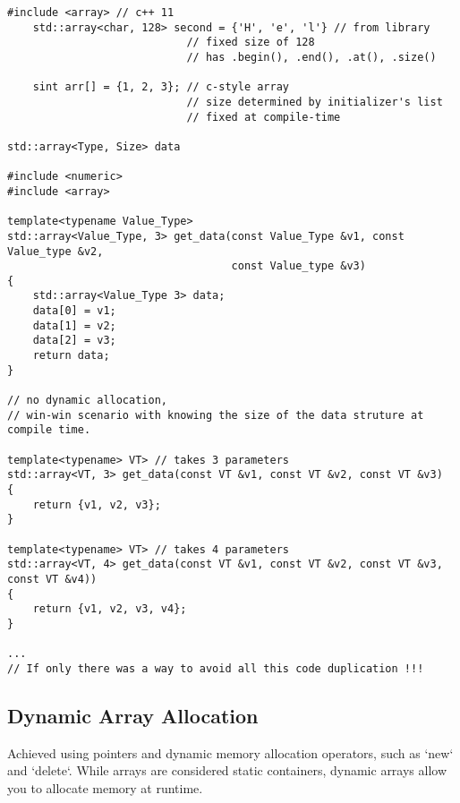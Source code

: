 \documentclass[openany]{report}
\begin{document}
\begin{verbatim}
#include <array> // c++ 11
    std::array<char, 128> second = {'H', 'e', 'l'} // from library
                            // fixed size of 128
                            // has .begin(), .end(), .at(), .size() 

    sint arr[] = {1, 2, 3}; // c-style array 
                            // size determined by initializer's list
                            // fixed at compile-time 

std::array<Type, Size> data

#include <numeric>
#include <array>

template<typename Value_Type>
std::array<Value_Type, 3> get_data(const Value_Type &v1, const Value_type &v2,
                                   const Value_type &v3)
{
    std::array<Value_Type 3> data;
    data[0] = v1;
    data[1] = v2;
    data[2] = v3;
    return data;
}

// no dynamic allocation, 
// win-win scenario with knowing the size of the data struture at compile time.

template<typename> VT> // takes 3 parameters
std::array<VT, 3> get_data(const VT &v1, const VT &v2, const VT &v3)
{
    return {v1, v2, v3};
}

template<typename> VT> // takes 4 parameters
std::array<VT, 4> get_data(const VT &v1, const VT &v2, const VT &v3, const VT &v4))
{
    return {v1, v2, v3, v4};
}

... 
// If only there was a way to avoid all this code duplication !!!
\end{verbatim}

\subsection{Dynamic Array Allocation}

Achieved using pointers and dynamic memory allocation operators, such as `new` and `delete`. 
While arrays are considered static containers,
dynamic arrays allow you to allocate memory at runtime.
\end{document}
